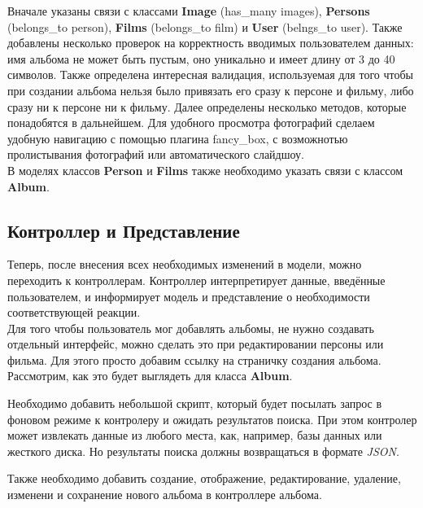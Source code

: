 
Вначале указаны связи с классами \textbf{Image} (has\_many \:images), \textbf{Persons} (belongs\_to \:person), \textbf{Films} (belongs\_to \:film) и \textbf{User} (belngs\_to \:user). Также добавлены несколько проверок на корректность вводимых пользователем данных: имя альбома не может быть пустым, оно уникально и имеет длину от 3 до 40 символов. Также определена интересная валидация, используемая для того чтобы при создании альбома нельзя было привязать его сразу к персоне и фильму, либо сразу ни к персоне ни к фильму. Далее определены несколько методов, которые понадобятся в дальнейшем. Для удобного просмотра фотографий сделаем удобную навигацию с помощью плагина fancy_box, с возможнотью пролистывания фотографий или автоматического слайдшоу.\\

В моделях классов \textbf{Person} и \textbf{Films} также необходимо указать связи с классом \textbf{Album}.



\subsection{Контроллер и Представление}
Теперь, после внесения всех необходимых изменений в модели, можно переходить к контроллерам. Контроллер интерпретирует данные, введённые пользователем, и информирует модель и представление о необходимости соответствующей реакции.\\
\hspace*{0.25cm}Для того чтобы пользователь мог добавлять альбомы, не нужно создавать отдельный интерфейс, можно сделать это при редактировании персоны или фильма. Для этого просто добавим ссылку на страничку создания альбома. 
Рассмотрим, как это будет выглядеть для класса \textbf{Album}.



Необходимо добавить небольшой скрипт, который будет посылать запрос в фоновом режиме к контролеру и ожидать результатов поиска. При этом контролер может извлекать данные из любого места, как, например, базы данных или жесткого диска. Но результаты поиска должны возвращаться  в формате \textit{JSON}.



Также необходимо добавить создание, отображение, редактирование, удаление, изменени и сохранение нового альбома в контроллере альбома.

 

